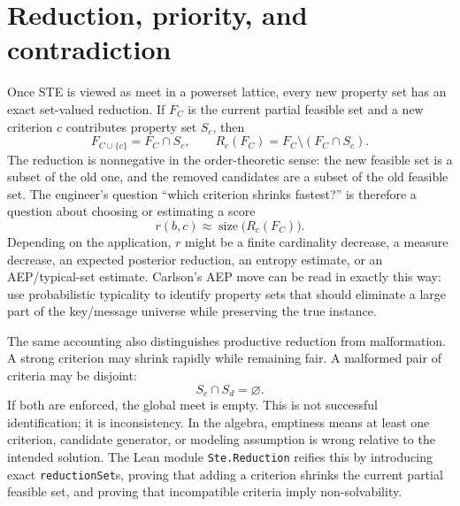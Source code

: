 \documentclass[11pt]{article}
\begin{document}
\section{Reduction, priority, and contradiction}
Once STE is viewed as meet in a powerset lattice, every new property set has an
exact set-valued reduction.  If $F_C$ is the current partial feasible set and a
new criterion $c$ contributes property set $S_c$, then
\[
  F_{C\cup\{c\}} = F_C \cap S_c,
  \qquad
  R_c(F_C) = F_C \setminus (F_C\cap S_c).
\]
The reduction is nonnegative in the order-theoretic sense: the new feasible set
is a subset of the old one, and the removed candidates are a subset of the old
feasible set.  The engineer's question ``which criterion shrinks fastest?'' is
therefore a question about choosing or estimating a score
\[
  r(b,c) \approx \operatorname{size}\bigl(R_c(F_C)\bigr).
\]
Depending on the application, $r$ might be a finite cardinality decrease, a
measure decrease, an expected posterior reduction, an entropy estimate, or an
AEP/typical-set estimate.  Carlson's AEP move can be read in exactly this way:
use probabilistic typicality to identify property sets that should eliminate a
large part of the key/message universe while preserving the true instance.

The same accounting also distinguishes productive reduction from malformation.
A strong criterion may shrink rapidly while remaining fair.  A malformed pair
of criteria may be disjoint:
\[
  S_c \cap S_d = \varnothing.
\]
If both are enforced, the global meet is empty.  This is not successful
identification; it is inconsistency.  In the algebra, emptiness means at least
one criterion, candidate generator, or modeling assumption is wrong relative to
the intended solution.  The Lean module \texttt{Ste.Reduction} reifies this by
introducing exact \texttt{reductionSet}s, proving that adding a criterion
shrinks the current partial feasible set, and proving that incompatible
criteria imply non-solvability.
\end{document}

